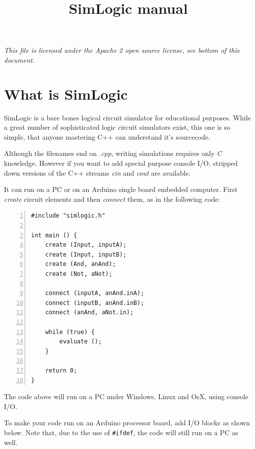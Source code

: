 \documentclass[a4paper,11pt]{article}
\begin{document}
\title{SimLogic manual}
\date{}

\maketitle

\emph{This file is licensed under the Apache 2 open source license, see bottom of this document.}

\section{What is SimLogic}

SimLogic is a bare bones logical circuit simulator for educational purposes.
While a great number of sophisticated logic circuit simulators exist,
this one is so simple, that anyone mastering C++ can understand it's sourcecode.

Although the filenames end on \emph{.cpp}, writing simulations requires only \emph{C} knowledge.
However if you want to add special purpose console I/O,
stripped down versions of the C++ streams \emph{cin} and \emph{cout} are available.

It can run on a PC or on an Arduino single board embedded computer.
First \emph{create} circuit elements and then \emph{connect} them, as in the following code:

\begin{lstlisting}[caption={Simulation of a Nand circuit, in the project nand\_example}, numbers=left]
#include "simlogic.h"

int main () {    
    create (Input, inputA);
    create (Input, inputB);
    create (And, anAnd);
    create (Not, aNot);

    connect (inputA, anAnd.inA);
    connect (inputB, anAnd.inB);
    connect (anAnd, aNot.in);

    while (true) {
        evaluate ();
    }
    
    return 0;
}
\end{lstlisting}

The code above will run on a PC under Windows, Linux and OsX, using console I/O.

To make your code run on an Arduino processor board, add I/O blocks as shown below.
Note that, due to the use of \verb!#ifdef!, the code will still run on a PC as well.
\end{document}
